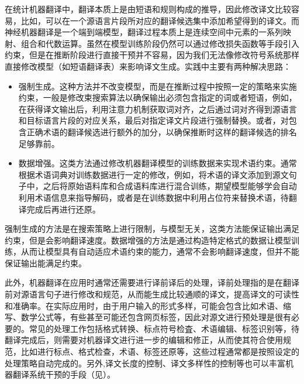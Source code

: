 \parinterval 在统计机器翻译中，翻译本质上是由短语和规则构成的推导，因此修改译文比较容易，比如，可以在一个源语言片段所对应的翻译候选集中添加希望得到的译文。而神经机器翻译是一个端到端模型，翻译过程本质上是连续空间中元素的一系列映射、组合和代数运算。虽然在模型训练阶段仍然可以通过修改损失函数等手段引入约束，但是在推断阶段进行直接干预并不容易，因为我们无法像修改符号系统那样直接修改模型（如短语翻译表）来影响译文生成。实践中主要有两种解决思路：

\begin{itemize}
\vspace{0.5em}
\item 强制生成。这种方法并不改变模型，而是在推断过程中按照一定的策略来实施约束，一般是修改束搜索算法以确保输出必须包含指定的词或者短语，例如，在获得译文输出后，利用注意力机制获取词对齐，之后通过词对齐得到源语言和目标语言片段的对应关系，最后对指定译文片段进行强制替换。或者，对包含正确术语的翻译候选进行额外的加分，以确保推断时这样的翻译候选的排名足够靠前。

\vspace{0.5em}
\item 数据增强。这类方法通过修改机器翻译模型的训练数据来实现术语约束。通常根据术语词典对训练数据进行一定的修改，例如，将术语的译文添加到源文句子中，之后将原始语料库和合成语料库进行混合训练，期望模型能够学会自动利用术语信息来指导解码，或者是在训练数据中利用占位符来替换术语，待翻译完成后再进行还原。

\vspace{0.5em}
\end{itemize}

\parinterval 强制生成的方法是在搜索策略上进行限制，与模型无关，这类方法能保证输出满足约束，但是会影响翻译速度。数据增强的方法是通过构造特定格式的数据让模型训练，从而让模型具有自动适应术语约束的能力，通常不会影响翻译速度，但并不能保证输出能满足约束。

\parinterval 此外，机器翻译在应用时通常还需要进行译前译后的处理，译前处理指的是在翻译前对源语言句子进行修改和规范，从而能生成比较通顺的译文，提高译文的可读性和准确率。在实际应用时，由于用户输入的形式多样，可能会包含比如术语、缩写、数学公式等，有些甚至可能还包含网页标签，因此对源文进行预处理是很有必要的。常见的处理工作包括格式转换、标点符号检査、术语编辑、标签识别等，待翻译完成后，则需要对机器译文进行进一步的编辑和修正，从而使其符合使用规范，比如进行标点、格式检查，术语、标签还原等，这些过程通常都是按照设定的处理策略自动完成的。另外,译文长度的控制、译文多样性的控制等也可以丰富机器翻译系统干预的手段（见{\chapterfourteen}）。

